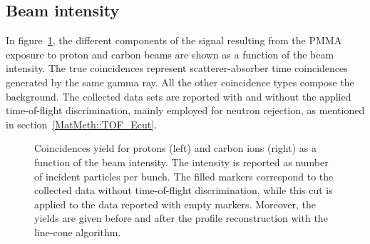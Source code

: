 \subsection{Beam intensity}
\label{Results::beamInt}
 
In figure~\ref{fig:coincidences}, the different components of the signal resulting from the PMMA exposure to proton and carbon beams are shown as a function of the beam intensity. The true coincidences represent scatterer-absorber time coincidences generated by the same gamma ray. All the other coincidence types compose the background. The collected data sets are reported with and without the applied time-of-flight discrimination, mainly employed for neutron rejection, as mentioned in section~\ref{MatMeth::TOF_Ecut}.


\begin{figure} [!h]
  \caption{Coincidences yield for protons (left) and carbon ions (right) as a function of the beam intensity. The intensity is reported as number of incident particles per bunch. The filled markers correspond to the collected data without time-of-flight discrimination, while this cut is applied to the data reported with empty markers. Moreover, the yields are given before and after the profile reconstruction with the line-cone algorithm.}
  \label{fig:coincidences}
\end{figure}

